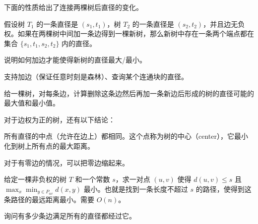 下面的性质给出了连接两棵树后直径的变化。
\begin{property}
    假设树 $T_1$ 的一条直径是 $(s_1,t_1)$，树 $T_2$ 的一条直径是 $(s_2,t_2)$，并且边无负权。如果在两棵树中间加一条边得到一棵新树，那么新树中存在一条两个端点都在集合 $\{s_1,t_1,s_2,t_2\}$ 内的直径。
\end{property}
\begin{exercise}
    说明如何加边才能使得新树的直径最大/最小。
\end{exercise}
\begin{exercise}
    支持加边（保证任意时刻是森林）、查询某个连通块的直径。
\end{exercise}
\begin{exercise}[P3596]
    给一棵树，对每条边，计算删除这条边然后再加一条新边后形成的树的直径可能的最大值和最小值。
\end{exercise}

对于边权为正的树，还有以下结论：
\begin{property}
    所有直径的中点（允许在边上）都相同。这个点称为树的中心（center），它最小化到树上所有点的最大距离。
\end{property}
\begin{remark}
    对于有零边的情况，可以把零边缩起来。
\end{remark}

\begin{exercise}[P1099/P2491]
    给定一棵非负权的树 $T$ 和一个常数 $s$，求一对点 $(u,v)$ 使得 $d(u,v)\le s$ 且 $\max_{x}\min_{y\in P_{uv}}d(x,y)$ 最小。也就是找到一条长度不超过 $s$ 的路径，使得到这条路径的最远距离最小。需要 $O(n)$。
\end{exercise}
\begin{exercise}[P3304]
    询问有多少条边满足所有的直径都经过它。
\end{exercise}

